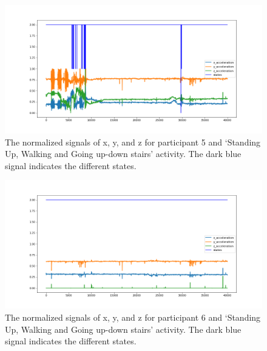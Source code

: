 \begin{figure}[H]
    \centering
    \begin{minipage}[b]{1\textwidth}
        \includegraphics[width=\textwidth]{manuscript/src/figures/Ass3/Ass3_Q2_states_user_4N.png}
    \end{minipage}
    \caption{The normalized signals of x, y, and z for participant 5 and ‘Standing  Up,  Walking  and  Going  up-down  stairs’ activity. The dark blue signal indicates the different states.}
    \label{fig:Ass3_Q2_states_user_4N}
\end{figure}
\begin{figure}[H]
    \centering
    \begin{minipage}[b]{1\textwidth}
        \includegraphics[width=\textwidth]{manuscript/src/figures/Ass3/Ass3_Q2_states_user_5N.png}
    \end{minipage}
    \caption{The normalized signals of x, y, and z for participant 6 and ‘Standing  Up,  Walking  and  Going  up-down  stairs’ activity. The dark blue signal indicates the different states.}
    \label{fig:Ass3_Q2_states_user_5N}
\end{figure}
